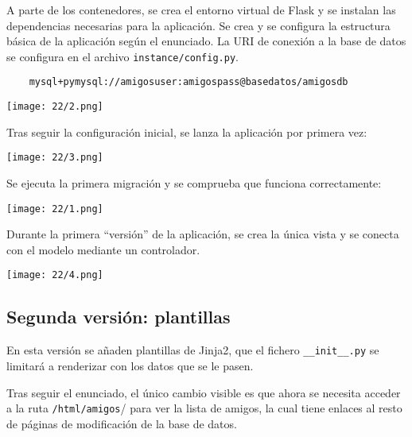 A parte de los contenedores, se crea el entorno virtual de Flask y se instalan las
dependencias necesarias para la aplicación. Se crea y se configura la estructura básica
de la aplicación según el enunciado. La URI de conexión a la base de datos se configura
en el archivo \Verb#instance/config.py#.

\begin{verbatim}
	mysql+pymysql://amigosuser:amigospass@basedatos/amigosdb
\end{verbatim}

\begin{minipage}{\linewidth}
	\centering
	\texttt{[image: 22/2.png]}
	\label{fig:2/14}
\end{minipage}

Tras seguir la configuración inicial, se lanza la aplicación por primera vez:

\begin{minipage}{\linewidth}
	\centering
	\texttt{[image: 22/3.png]}
	\label{fig:2/16}
\end{minipage}

Se ejecuta la primera migración y se comprueba que funciona correctamente:

\begin{minipage}{\linewidth}
	\centering
	\texttt{[image: 22/1.png]}
	\label{fig:2/15}
\end{minipage}

Durante la primera ``versión'' de la aplicación, se crea la única vista y
se conecta con el modelo mediante un controlador.

\begin{minipage}{\linewidth}
	\centering
	\texttt{[image: 22/4.png]}
	\label{fig:2/17}
\end{minipage}

\subsection{Segunda versión: plantillas}
En esta versión se añaden plantillas de Jinja2, que el fichero \Verb#__init__.py#
se limitará a renderizar con los datos que se le pasen.

Tras seguir el enunciado, el único cambio visible es que ahora se necesita acceder
a la ruta \Verb#/html/amigos#/ para ver la lista de amigos, la cual tiene enlaces
al resto de páginas de modificación de la base de datos.

